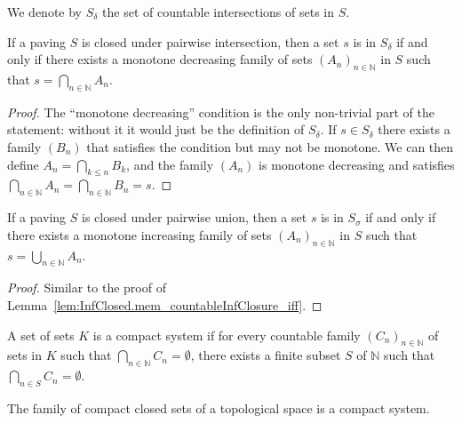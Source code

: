 \begin{definition}\label{def:countableInfClosure}
  \leanok
We denote by $S_\delta$ the set of countable intersections of sets in $S$.
\end{definition}


\begin{lemma}\label{lem:InfClosed.mem_countableInfClosure_iff}
If a paving $S$ is closed under pairwise intersection, then a set $s$ is in $S_\delta$ if and only if there exists a monotone decreasing family of sets $(A_n)_{n\in\mathbb{N}}$ in $S$ such that $s = \bigcap_{n\in\mathbb{N}} A_n$.
\end{lemma}

\begin{proof}The ``monotone decreasing'' condition is the only non-trivial part of the statement: without it it would just be the definition of $S_\delta$.
If $s \in S_\delta$ there exists a family $(B_n)$ that satisfies the condition but may not be monotone. We can then define $A_n = \bigcap_{k \le n} B_k$, and the family $(A_n)$ is monotone decreasing and satisfies $\bigcap_{n\in\mathbb{N}} A_n = \bigcap_{n\in\mathbb{N}} B_n = s$.
\end{proof}


\begin{lemma}\label{lem:SupClosed.mem_countableSupClosure_iff}
If a paving $S$ is closed under pairwise union, then a set $s$ is in $S_\sigma$ if and only if there exists a monotone increasing family of sets $(A_n)_{n\in\mathbb{N}}$ in $S$ such that $s = \bigcup_{n\in\mathbb{N}} A_n$.
\end{lemma}

\begin{proof}Similar to the proof of Lemma~\ref{lem:InfClosed.mem_countableInfClosure_iff}.
\end{proof}


\begin{definition}\label{def:IsCompactSystem}
  \mathlibok
A set of sets $K$ is a compact system if for every countable family $(C_n)_{n \in \mathbb{N}}$ of sets in $K$ such that $\bigcap_{n \in\mathbb{N}} C_n = \emptyset$, there exists a finite subset $S$ of $\mathbb{N}$ such that $\bigcap_{n \in S} C_n = \emptyset$.
\end{definition}


\begin{lemma}\label{lem:isCompactSystem_isCompact_isClosed}
The family of compact closed sets of a topological space is a compact system.
\end{lemma}

